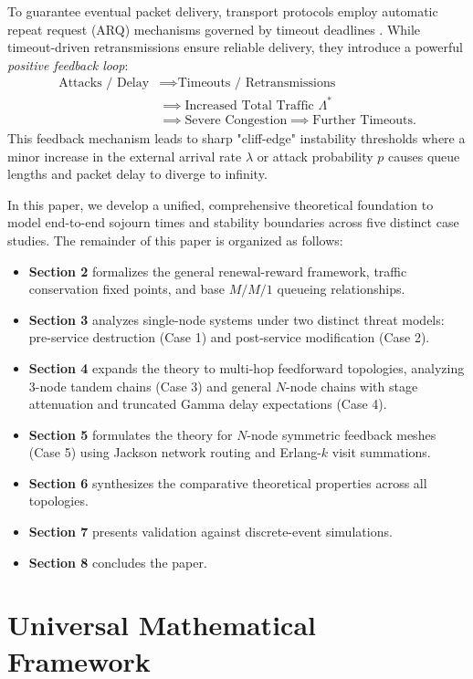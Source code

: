 \documentclass[12pt,onecolumn]{article}
\begin{document}
To guarantee eventual packet delivery, transport protocols employ automatic repeat request (ARQ) mechanisms governed by timeout deadlines \cite{fall1996simulation}. While timeout-driven retransmissions ensure reliable delivery, they introduce a powerful \textit{positive feedback loop}:
\begin{align*}
\text{Attacks / Delay} &\implies \text{Timeouts / Retransmissions} \\
&\implies \text{Increased Total Traffic } \Lambda^* \\
&\implies \text{Severe Congestion} \implies \text{Further Timeouts.}
\end{align*}
This feedback mechanism leads to sharp "cliff-edge" instability thresholds where a minor increase in the external arrival rate $\lambda$ or attack probability $p$ causes queue lengths and packet delay to diverge to infinity.

In this paper, we develop a unified, comprehensive theoretical foundation to model end-to-end sojourn times and stability boundaries across five distinct case studies. The remainder of this paper is organized as follows:
\begin{itemize}
    \item \textbf{Section 2} formalizes the general renewal-reward framework, traffic conservation fixed points, and base $M/M/1$ queueing relationships.
    \item \textbf{Section 3} analyzes single-node systems under two distinct threat models: pre-service destruction (Case 1) and post-service modification (Case 2).
    \item \textbf{Section 4} expands the theory to multi-hop feedforward topologies, analyzing 3-node tandem chains (Case 3) and general $N$-node chains with stage attenuation and truncated Gamma delay expectations (Case 4).
    \item \textbf{Section 5} formulates the theory for $N$-node symmetric feedback meshes (Case 5) using Jackson network routing and Erlang-$k$ visit summations.
    \item \textbf{Section 6} synthesizes the comparative theoretical properties across all topologies.
    \item \textbf{Section 7} presents validation against discrete-event simulations.
    \item \textbf{Section 8} concludes the paper.
\end{itemize}

\section{Universal Mathematical Framework}
\end{document}
